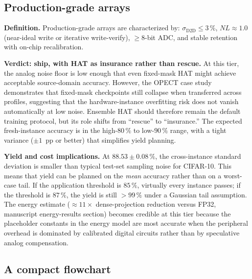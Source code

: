 \subsection{Production-grade arrays}

\textbf{Definition.}  Production-grade arrays are characterized by: $\sigma_{\mathrm{D2D}} \le 3\,\%$, $NL \approx 1.0$ (near-ideal write or iterative write-verify), $\ge 8$-bit ADC, and stable retention with on-chip recalibration.

\textbf{Verdict: ship, with HAT as insurance rather than rescue.}  At this tier, the analog noise floor is low enough that even fixed-mask HAT might achieve acceptable source-domain accuracy.  However, the OPECT case study demonstrates that fixed-mask checkpoints still collapse when transferred across profiles, suggesting that the hardware-instance overfitting risk does not vanish automatically at low noise.  Ensemble HAT should therefore remain the default training protocol, but its role shifts from ``rescue'' to ``insurance.''  The expected fresh-instance accuracy is in the high-$80\,\%$ to low-$90\,\%$ range, with a tight variance ($\pm 1$~pp or better) that simplifies yield planning.

\textbf{Yield and cost implications.}  At $88.53\pm0.08\,\%$, the cross-instance standard deviation is smaller than typical test-set sampling noise for CIFAR-10.  This means that yield can be planned on the \emph{mean} accuracy rather than on a worst-case tail.  If the application threshold is $85\,\%$, virtually every instance passes; if the threshold is $87\,\%$, the yield is still $>99\,\%$ under a Gaussian tail assumption.  The energy estimate ($\approx 11\times$ dense-projection reduction versus FP32, manuscript energy-results section) becomes credible at this tier because the placeholder constants in the energy model are most accurate when the peripheral overhead is dominated by calibrated digital circuits rather than by speculative analog compensation.

\subsection{A compact flowchart}

